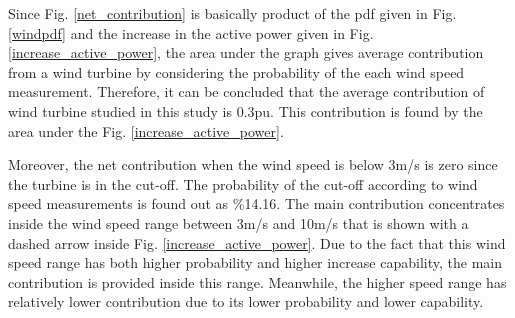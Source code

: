 Since Fig. \ref{net_contribution} is basically product of the pdf given in Fig. \ref{windpdf} and the increase in the active power given in Fig. \ref{increase_active_power}, the area under the graph gives average contribution from a wind turbine by considering the probability of the each wind speed measurement. Therefore, it can be concluded that the average contribution of wind turbine studied in this study is 0.3pu. This contribution is found by the area under the Fig. \ref{increase_active_power}.\par
Moreover, the net contribution when the wind speed is below 3m/s is zero since the turbine is in the cut-off. The probability of the cut-off according to wind speed measurements is found out as \%14.16. The main contribution concentrates inside the wind speed range between 3m/s and 10m/s that is shown with a dashed arrow inside Fig. \ref{increase_active_power}. Due to the fact that this wind speed range has both higher probability and higher increase capability, the main contribution is provided inside this range. Meanwhile, the higher speed range has relatively lower contribution due to its lower probability and lower capability. \par

